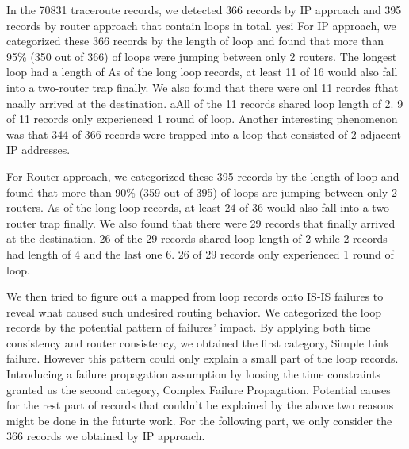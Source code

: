 \documentclass[conference, twocolumn, oneside, 10pt]{IEEEtran}
\begin{document}
In the 70831 traceroute records, we detected 366 records by IP approach and 395 records by router approach that contain loops in total. 
yesi
For IP approach, we categorized these 366 records by the length of loop and found that more than 95\% (350 out of 366) of loops were jumping between only 2 routers. The longest loop had a length of As of the long loop records, at least 11 of 16 would also fall into a two-router trap finally. We also found that there were onl 11 rcordes fthat naally arrived at the destination. aAll of the 11 records shared loop length of 2. 9 of 11 records only experienced 1 round of loop. Another interesting phenomenon was that 344 of 366 records were trapped into a loop that consisted of 2 adjacent IP addresses.


For Router approach, we categorized these 395 records by the length of loop and found that more than 90\% (359 out of 395) of loops are jumping between only 2 routers. As of the long loop records, at least 24 of 36 would also fall into a two-router trap finally. We also found that there were 29 records that finally arrived at the destination. 26 of the 29 records shared loop length of 2 while 2 records had length of 4 and the last one 6. 26 of 29 records only experienced 1 round of loop.


We then tried to figure out a mapped from loop records onto IS-IS failures to reveal what caused such undesired routing behavior. We categorized the loop records by the potential pattern of failures' impact. By applying both time consistency and router consistency, we obtained the first category, Simple Link failure. However this pattern could only explain a small part of the loop records. Introducing a failure propagation assumption by loosing the time constraints granted us the second category, Complex Failure Propagation. Potential causes for the rest part of records that couldn't be explained by the above two reasons might be done in the futurte work. For the following part, we only consider the 366 records we obtained by IP approach.
\end{document}
